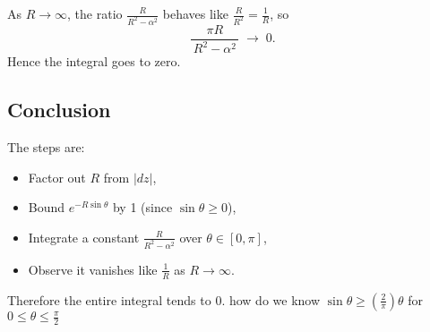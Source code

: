 \documentclass[12pt]{article}
\theoremstyle{definition} %
\theoremstyle{plain} %
\begin{document}
As $R\to\infty$, the ratio $\frac{R}{R^2 - \alpha^2}$ behaves like $\frac{R}{R^2}=\frac{1}{R}$, so
\[
\frac{\pi R}{\,R^2 - \alpha^2\,}
\;\longrightarrow\; 0.
\]
Hence the integral goes to zero.

\subsection*{Conclusion}

The steps are:
\begin{itemize}
\item Factor out $R$ from $|dz|$,
\item Bound $e^{-R\sin\theta}$ by 1 (since $\sin\theta\ge 0$),
\item Integrate a constant $\frac{R}{R^2-\alpha^2}$ over $\theta\in[0,\pi]$,
\item Observe it vanishes like $\frac{1}{R}$ as $R\to\infty$.
\end{itemize}
Therefore the entire integral tends to $0$.
how do we know $\sin \theta \geq (\frac{2}{\pi})\theta$ for $0\leq \theta \leq \frac{\pi}{2}$  
\end{document}
